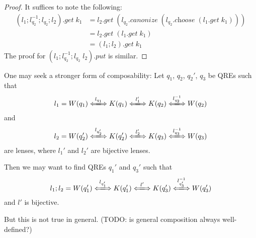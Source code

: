 \documentclass[a4paper,11pt] {article}
\theoremstyle{plain}
\newcommand{\lget}[1]{\textit{$#1$.get}}
\newcommand{\lput}[1]{\textit{$#1$.put}}
\newcommand{\lcanonize}[1]{\textit{$#1$.canonize}}
\newcommand{\lchoose}[1]{\textit{$#1$.choose}}
\newcommand{\lensbetween}[1]{\xLongleftrightarrow{#1}}
\begin{document}
\begin{proof}
  It suffices to note the following:
  \begin{align*}
    \lget{(l_1 ; l_{q_2}^{-1} ; l_{q_2} ; l_2)} \; k_1
    &= 
    \lget{l_2} \; (\lcanonize{l_{q_2}} \; (\lchoose{l_{q_2}} \;
    (\lget{l_1} \; k_1))) \\
    &= \lget{l_2} \; (\lget{l_1} \; k_1) \\
    &= \lget{(l_1 ; l_2)} \; k_1
  \end{align*}
  The proof for $\lput{(l_1; l_{q_2}^{-1}; l_{q_2} \; l_2)}$ is similar.
\end{proof}
One may seek a stronger form of composability:
Let $q_1$, $q_2$, $q_2'$, $q_3$ be QREs such that
\begin{align*}
  l_1 = W(q_1) \lensbetween{l_{q_1}} K(q_1)
  \lensbetween{l_1'} K(q_2) \lensbetween{l_{q_2}^{-1}} W(q_2)
\end{align*}
and
\begin{align*}
  l_2 = 
  W(q_2') \lensbetween{l_{q_2'}} K(q_2')
  \lensbetween{l_2'} K(q_3)
  \lensbetween{l_{q_3}^{-1}} W(q_3)
\end{align*}
are lenses, where $l_1'$ and $l_2'$ are bijective lenses.

Then we may want to find QREs $q_1'$ and $q_3'$ such that
\begin{align*}
  l_1; l_2 = W(q_1') \lensbetween{l_{q_1'}} K(q_1')
  \lensbetween{l'} K(q_3') \lensbetween{l_{q_3'}^{-1}} W(q_3')
\end{align*}
and $l'$ is bijective.

But this is not true in general.
(TODO: is general composition always well-defined?)
\end{document}
